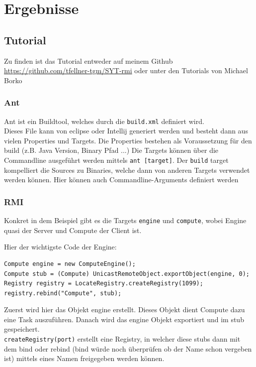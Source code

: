 
\section{Ergebnisse}
\label{sec:Ergebnisse}

\subsection{Tutorial}

Zu finden ist das Tutorial entweder auf meinem Github \url{https://github.com/tfellner-tgm/SYT-rmi} \cite{repo} oder unter den Tutorials von Michael Borko \cite{bsp-command-pattern}

\subsubsection{Ant}

Ant ist ein Buildtool, welches durch die \texttt{build.xml} definiert wird.\\
Dieses File kann von eclipse oder Intellij generiert werden und besteht dann aus vielen Properties und Targets.
Die Properties bestehen als Voraussetzung f\"ur den build (z.B. Java Version, Binary Pfad ...)
Die Targets k\"onnen \"uber die Commandline ausgef\"uhrt werden mittels \texttt{ant [target]}. Der \texttt{build} target kompelliert die Sources zu Binaries, welche dann von anderen Targets verwendet werden k\"onnen. Hier k\"onnen auch Commandline-Arguments definiert werden

\subsubsection{RMI}

Konkret in dem Beispiel gibt es die Targets \texttt{engine} und \texttt{compute}, wobei Engine quasi der Server und Compute der Client ist.

Hier der wichtigste Code der Engine:

\begin{lstlisting}[style=Java, caption=Engine]
Compute engine = new ComputeEngine();
Compute stub = (Compute) UnicastRemoteObject.exportObject(engine, 0);
Registry registry = LocateRegistry.createRegistry(1099);
registry.rebind("Compute", stub);
\end{lstlisting}

Zuerst wird hier das Objekt engine erstellt. Dieses Objekt dient Compute dazu
eine Task auszuf\"uhren.
Danach wird das engine Objekt exportiert und im stub gespeichert. \\
\texttt{createRegistry(port)} erstellt eine Registry, in welcher diese stubs dann mit
dem bind oder rebind (bind w\"urde noch \"uberpr\"ufen ob der Name schon vergeben ist) mittels eines Namen freigegeben werden k\"onnen.

